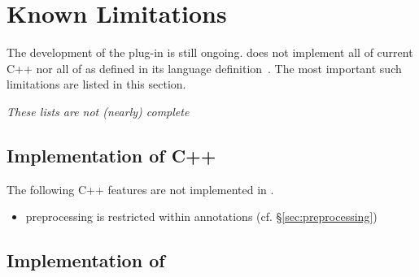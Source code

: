\chapter{Known Limitations}

The development of the \fclang plug-in is still ongoing.
\fclang does not implement all of current C++ nor all of 
\acslpp as defined in its language definition~\cite{acslpp}.
The most important such limitations are listed in this section.

\textit{These lists are not (nearly) complete}

\section{Implementation of C++}

The following C++ features are not implemented in \acslpp.
\begin{itemize}
\item preprocessing is restricted within \acslpp annotations (cf. \S\ref{sec:preprocessing})
\end{itemize}

\section{Implementation of \acslpp}

